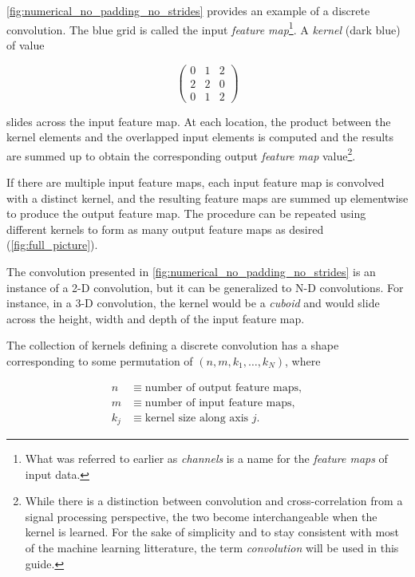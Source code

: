 \documentclass{report}
\begin{document}
\autoref{fig:numerical_no_padding_no_strides} provides an example of a discrete
convolution. The blue grid is called the input {\em feature map}\footnote{
    What was referred to earlier as {\em channels} is a name for the {\em
    feature maps} of input data.}.
A {\em kernel} (dark blue) of value

\begin{equation*}
\begin{pmatrix}
    0 & 1 & 2 \\
    2 & 2 & 0 \\
    0 & 1 & 2
\end{pmatrix}
\end{equation*}

slides across the input feature map. At each location, the product between the
kernel elements and the overlapped input elements is computed and the results
are summed up to obtain the corresponding output {\em feature map}
value\footnote{
    While there is a distinction between convolution and cross-correlation from
    a signal processing perspective, the two become interchangeable when the
    kernel is learned. For the sake of simplicity and to stay consistent with
    most of the machine learning litterature, the term {\em convolution}
    will be used in this guide.}.

If there are multiple input feature maps, each input feature map is convolved
with a distinct kernel, and the resulting feature maps are summed up elementwise
to produce the output feature map. The procedure can be repeated using different
kernels to form as many output feature maps as desired
(\autoref{fig:full_picture}).

The convolution presented in \autoref{fig:numerical_no_padding_no_strides} is an
instance of a 2-D convolution, but it can be generalized to N-D convolutions.
For instance, in a 3-D convolution, the kernel would be a {\em cuboid} and would
slide across the height, width and depth of the input feature map.

The collection of kernels defining a discrete convolution has a shape
corresponding to some permutation of $(n, m, k_1, \ldots, k_N)$, where

\begin{equation*}
\begin{split}
    n &\equiv \text{number of output feature maps},\\
    m &\equiv \text{number of input feature maps},\\
    k_j &\equiv \text{kernel size along axis $j$}.
\end{split}
\end{equation*}
\end{document}
